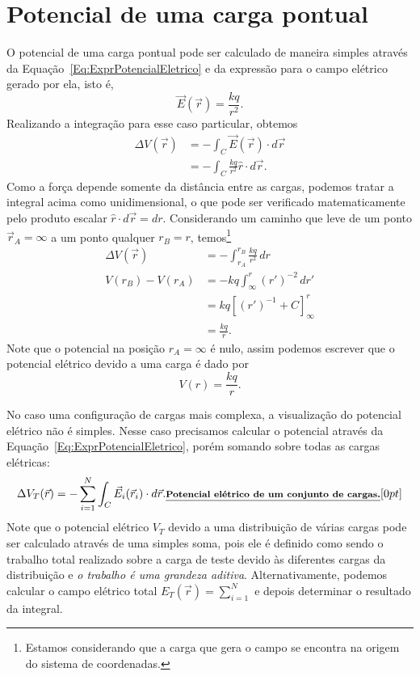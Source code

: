 \section{Potencial de uma carga pontual}

O potencial de uma carga pontual pode ser calculado de maneira simples através da Equação~\eqref{Eq:ExprPotencialEletrico} e da expressão para o campo elétrico gerado por ela, isto é,
\begin{equation}
    \vec{E}(\vec{r}) = \frac{kq}{r^2}.
\end{equation}
%
Realizando a integração para esse caso particular, obtemos
\begin{align}
    \Delta V(\vec{r}) &= - \int_C \vec{E}(\vec{r}) \cdot d\vec{r} \\
    &= - \int_C \frac{kq}{r^2} \hat{r} \cdot d\vec{r}.
\end{align}
%
Como a força depende somente da distância entre as cargas, podemos tratar a integral acima como unidimensional, o que pode ser verificado matematicamente pelo produto escalar $\hat{r}\cdot d\vec{r} = dr$. Considerando um caminho que leve de um ponto $\vec{r}_A = \infty$ a um ponto qualquer $r_B = r$, temos\footnote{Estamos considerando que a carga que gera o campo se encontra na origem do sistema de coordenadas.} 
\begin{align}
    \Delta V(\vec{r}) &= - \int_{r_A}^{r_B} \frac{kq}{r^2} \,dr \\
    V(r_B) - V(r_A) &= - kq \int_{\infty}^{r} (r')^{-2} \,dr' \\
    &= kq [(r')^{-1} + C]_{\infty}^{r} \\
    &= \frac{kq}{r}.
\end{align}
%
Note que o potencial na posição $r_A = \infty$ é nulo, assim podemos escrever que o potencial elétrico devido a uma carga é dado por
\begin{equation}
    V(r) = \frac{kq}{r}.
\end{equation}

No caso uma configuração de cargas mais complexa, a visualização do potencial elétrico não é simples. Nesse caso precisamos calcular o potencial através da Equação~\eqref{Eq:ExprPotencialEletrico}, porém somando sobre todas as cargas elétricas:
\begin{equation}\label{Eq:ExprPotencialEletricoConjCargas}
    \Delta V_T(\vec{r}) = - \sum_{i=1}^{N}\int_C \vec{E}_i(\vec{r}_i) \cdot d\vec{r}. \relax{\footnotesize\emph{\textbf{Potencial elétrico de um conjunto de cargas.}}}[0pt]
\end{equation}
%
Note que o potencial elétrico $V_T$ devido a uma distribuição de várias cargas pode ser calculado através de uma simples soma, pois ele é definido como sendo o trabalho total realizado sobre a carga de teste devido às diferentes cargas da distribuição e \emph{o trabalho é uma grandeza aditiva}. Alternativamente, podemos calcular o campo elétrico total $E_T(\vec{r}) = \sum_{i = 1}^{N}$ e depois determinar o resultado da integral.

